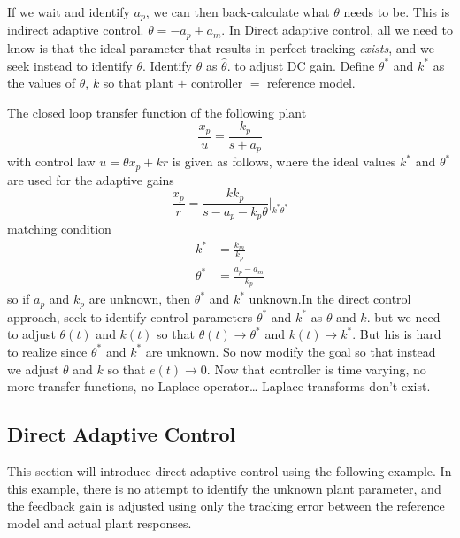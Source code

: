If we wait and identify $a_{p}$, we can then back-calculate what $\theta$ needs to be.
This is indirect adaptive control.
$\theta=-\hat{a}_{p}+a_{m}$.
In Direct adaptive control, all we need to know is that the ideal parameter that results in perfect tracking \textit{exists}, and we seek instead to identify $\theta$.
Identify $\theta$ as $\hat{\theta}$.
 to adjust DC gain.
Define $\theta^{*}$ and $k^{*}$ as the values of $\theta$, $k$ so that plant $+$ controller $=$ reference model.

The closed loop transfer function of the following plant
\begin{equation*}
  \frac{x_{p}}{u}=\frac{k_{p}}{s+a_{p}}
\end{equation*}
with control law
$u=\theta x_{p}+kr$
is given as follows, where the ideal values $k^{*}$ and $\theta^{*}$ are used for the adaptive gains
\begin{equation*}
  \frac{x_{p}}{r}=\frac{kk_{p}}{s-a_{p}-k_{p}\theta}\biggr|_{k^{*}\theta^{*}}
\end{equation*}
matching condition
\begin{align*}
  k^{*}&=\frac{k_{m}}{k_{p}} \\
  \theta^{*}&=\frac{a_{p}-a_{m}}{k_{p}}
\end{align*}
so if $a_{p}$ and $k_{p}$ are unknown, then $\theta^{*}$ and $k^{*}$ unknown.In the direct control approach, seek to identify control parameters $\theta^{*}$ and $k^{*}$ as $\theta$ and $k$.
but we need to adjust $\theta(t)$ and $k(t)$ so that $\theta(t)\rightarrow\theta^{*}$ and $k(t)\rightarrow k^{*}$.
But his is hard to realize since $\theta^{*}$ and $k^{*}$ are unknown.
So now modify the goal so that instead we adjust $\theta$ and $k$ so that $e(t)\rightarrow0$.
Now that controller is time varying, no more transfer functions, no Laplace operator\ldots
Laplace transforms don't exist.

\subsection{Direct Adaptive Control}

This section will introduce direct adaptive control using the following example.
In this example, there is no attempt to identify the unknown plant parameter, and the feedback gain is adjusted using only the tracking error between the reference model and actual plant responses.

